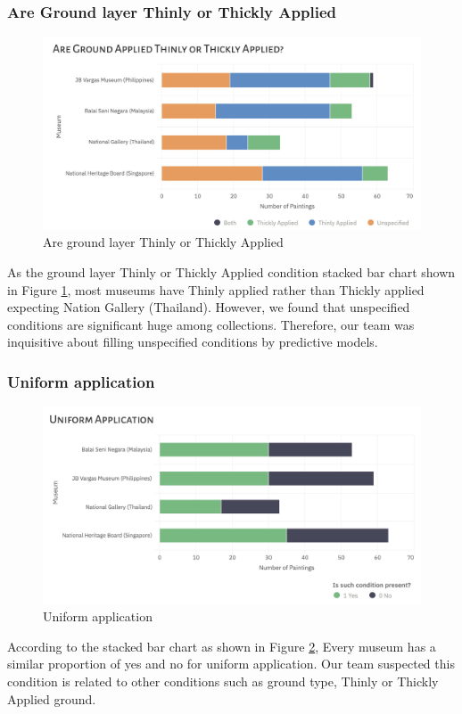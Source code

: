 \documentclass[11pt, oneside]{article}
\begin{document}
\subsubsection{Are Ground layer Thinly or Thickly Applied}
\begin{figure}[H]
    \centering
    \includegraphics[scale=0.5]{images/ThinVsThick_Ground_con.png}
    \caption{Are ground layer Thinly or Thickly Applied}
    \label{ThinVsThick_Ground_con}
\end{figure}
As the ground layer Thinly or Thickly Applied condition stacked bar chart shown in Figure \ref{ThinVsThick_Ground_con}, most museums have Thinly applied rather than Thickly applied expecting Nation Gallery (Thailand). However, we found that unspecified conditions are significant huge among collections. Therefore, our team was inquisitive about filling unspecified conditions by predictive models.


\subsubsection{Uniform application}
\begin{figure}[H]
    \centering
    \includegraphics[scale=0.5]{images/Uniform_app_ground_con.png}
    \caption{Uniform application}
    \label{Uniform_app_ground_con}
\end{figure}
According to the stacked bar chart as shown in Figure \ref{Uniform_app_ground_con}, Every museum has a similar proportion of yes and no for uniform application. Our team suspected this condition is related to other conditions such as ground type, Thinly or Thickly Applied ground.
\end{document}
